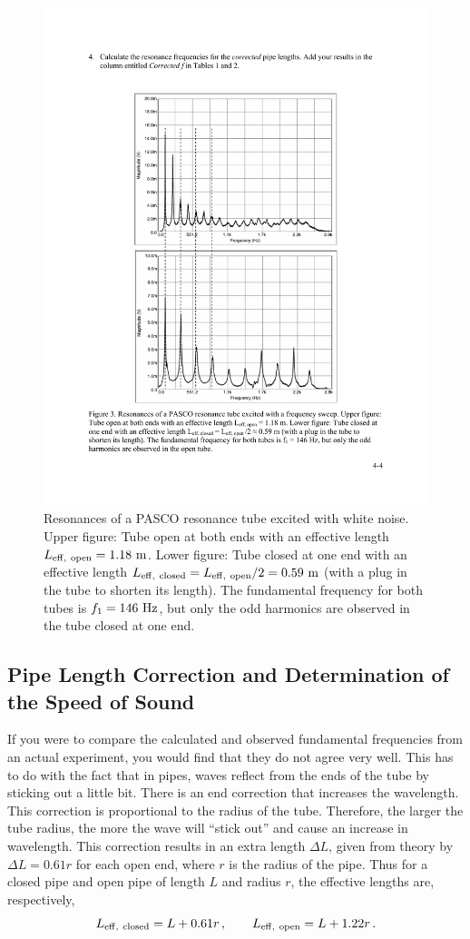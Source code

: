 \documentclass[11pt]{NSF}
\def\be{\begin{equation}}
\def\ee{\end{equation}}
\begin{document}
\begin{figure}[hbtp]
\begin{center}
\includegraphics[width=.7\textwidth]{fig4_3}
\caption{Resonances of a PASCO resonance tube excited with white noise.
Upper figure: Tube open at both ends with an effective length 
$L_{\rm eff,\ open} = 1.18~{\rm m}$.
Lower figure: Tube closed at one end with an effective length 
$L_{\rm eff,\ closed} = L_{\rm eff,\ open}/2 = 0.59~{\rm m}$ 
(with a plug in the tube to shorten its length). 
The fundamental frequency for both tubes is $f_1 = 146~{\rm Hz}$, 
but only the odd harmonics are observed in the tube closed at one end.}
\label{f:3} 
\end{center} 
\end{figure}
%

\subsection{Pipe Length Correction and Determination of the Speed of Sound}

If you were to compare the calculated and observed
fundamental frequencies from an actual experiment,
you would find that they do not agree very well.
This has to do with the fact that in pipes, waves 
reflect from the ends of the tube by sticking out a little bit. 
There is an end correction that increases the wavelength. 
This correction is proportional to the radius of the tube. 
Therefore, the larger the tube radius, the more the wave 
will ``stick out” and cause an increase in wavelength. 
This correction results in an extra length $\Delta L$, 
given from theory by $\Delta L = 0.61 r$ for each open end, 
where $r$ is the radius of the pipe. 
Thus for a closed pipe and open pipe of length $L$ and 
radius $r$, the effective lengths are, respectively,
%
\be
L_{\rm eff,\ closed} = L + 0.61 r\,,
\qquad
L_{\rm eff,\ open} = L + 1.22 r\,.
\label{e:Leff}
\ee
\end{document}

